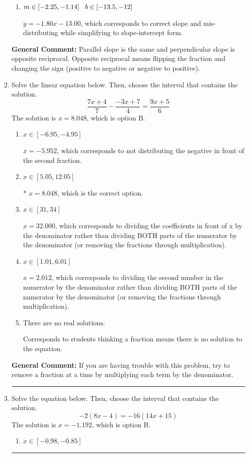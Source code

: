 \documentclass{extbook}[14pt]
\newcommand{\litem}[1]{\item #1

\rule{\textwidth}{0.4pt}}
\begin{document}
\begin{enumerate}
{\begin{enumerate}[label=\Alph*.]
* $y = -1.80x + 1.00$, which is the correct option.
\item \( m \in [-2.25, -1.14] \hspace*{3mm} b \in [-13.5, -12] \)

 $y = -1.80x - 13.00$, which corresponds to correct slope and mis-distributing while simplifying to slope-intercept form.
\end{enumerate}

\textbf{General Comment:} Parallel slope is the same and perpendicular slope is opposite reciprocal. Opposite reciprocal means flipping the fraction and changing the sign (positive to negative or negative to positive).
}
\litem{
Solve the linear equation below. Then, choose the interval that contains the solution.
\[ \frac{7x + 4}{7} - \frac{-3x + 7}{4} = \frac{9x + 5}{6} \]The solution is \( x = 8.048 \), which is option B.\begin{enumerate}[label=\Alph*.]
\item \( x \in [-6.95, -4.95] \)

 $x = -5.952$, which corresponds to not distributing the negative in front of the second fraction.
\item \( x \in [5.05, 12.05] \)

* $x = 8.048$, which is the correct option.
\item \( x \in [31, 34] \)

 $x = 32.000$, which corresponds to dividing the coefficients in front of x by the denominator rather than dividing BOTH parts of the numerator by the denominator (or removing the fractions through multiplication).
\item \( x \in [1.01, 6.01] \)

 $x = 2.012$, which corresponds to dividing the second number in the numerator by the denominator rather than dividing BOTH parts of the numerator by the denominator (or removing the fractions through multiplication).
\item \( \text{There are no real solutions.} \)

Corresponds to students thinking a fraction means there is no solution to the equation.
\end{enumerate}

\textbf{General Comment:} If you are having trouble with this problem, try to remove a fraction at a time by multiplying each term by the denominator.
}
\litem{
Solve the equation below. Then, choose the interval that contains the solution.
\[ -2(8x -4) = -16(14x + 15) \]The solution is \( x = -1.192 \), which is option B.\begin{enumerate}[label=\Alph*.]
\item \( x \in [-0.98, -0.85] \)


\end{enumerate}}
\end{enumerate}
\end{document}
